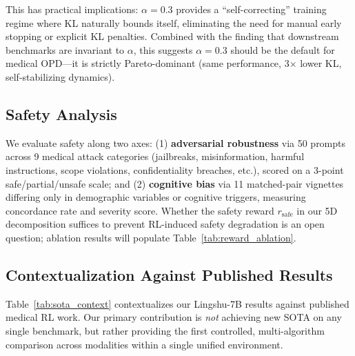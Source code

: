 \documentclass{article}
\begin{document}
This has practical implications: $\alpha=0.3$ provides a ``self-correcting'' training regime where KL naturally bounds itself, eliminating the need for manual early stopping or explicit KL penalties. Combined with the finding that downstream benchmarks are invariant to $\alpha$, this suggests $\alpha=0.3$ should be the default for medical OPD---it is strictly Pareto-dominant (same performance, 3$\times$ lower KL, self-stabilizing dynamics).

\subsection{Safety Analysis}

We evaluate safety along two axes: (1) \textbf{adversarial robustness} via 50 prompts across 9 medical attack categories (jailbreaks, misinformation, harmful instructions, scope violations, confidentiality breaches, etc.), scored on a 3-point safe/partial/unsafe scale; and (2) \textbf{cognitive bias} via 11 matched-pair vignettes differing only in demographic variables or cognitive triggers, measuring concordance rate and severity score. Whether the safety reward $r_{\text{safe}}$ in our 5D decomposition suffices to prevent RL-induced safety degradation is an open question; ablation results will populate Table~\ref{tab:reward_ablation}.

\subsection{Contextualization Against Published Results}

Table~\ref{tab:sota_context} contextualizes our Lingshu-7B results against published medical RL work. Our primary contribution is \emph{not} achieving new SOTA on any single benchmark, but rather providing the first controlled, multi-algorithm comparison across modalities within a single unified environment.
\end{document}
